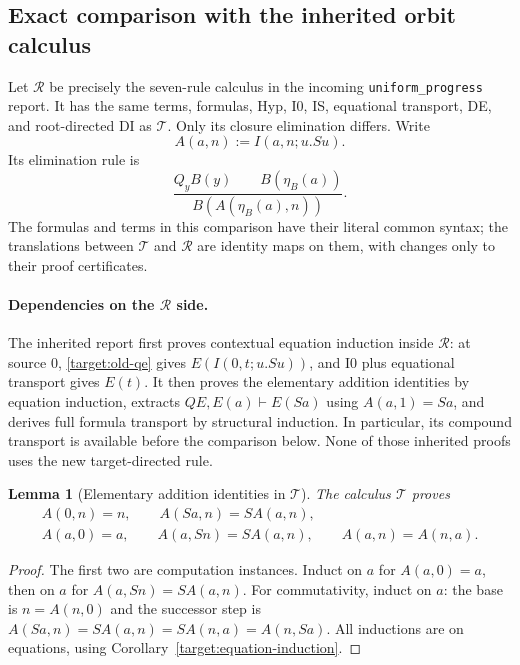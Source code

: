 \documentclass[11pt,a4paper]{article}
\newtheorem{lemma}[theorem]{Lemma}
\theoremstyle{definition}\newtheorem{definition}[theorem]{Definition}
\begin{document}
\subsection{Exact comparison with the inherited orbit calculus}
\label{target:orbit-equivalence-section}

Let $\mathcal R$ be precisely the seven-rule calculus in the incoming
\texttt{uniform\_progress} report.\cite{uniform}  It has the same terms, formulas, Hyp,
I0, IS, equational transport, DE, and root-directed DI as $\mathcal T$.
Only its closure elimination differs.  Write
\[
 A(a,n):=I(a,n;u.Su).
\]
Its elimination rule is
\begin{equation}
 \frac{Q_yB(y)\qquad B(\eta_B(a))}
      {B(A(\eta_B(a),n))}.
 \tag{Orbit QE}\label{target:old-qe}
\end{equation}
The formulas and terms in this comparison have their literal common
syntax; the translations between $\mathcal T$ and $\mathcal R$ are
identity maps on them, with changes only to their proof certificates.

\paragraph{Dependencies on the $\mathcal R$ side.}
The inherited report first proves contextual equation induction inside
$\mathcal R$: at source $0$, \eqref{target:old-qe} gives
$E(I(0,t;u.Su))$, and I0 plus equational transport gives $E(t)$.
It then proves the elementary addition identities by equation induction,
extracts $Q E,E(a)\vdash E(Sa)$ using $A(a,1)=Sa$, and derives full
formula transport by structural induction.  In particular, its compound
transport is available before the comparison below.  None of those
inherited proofs uses the new target-directed rule.

\begin{lemma}[Elementary addition identities in $\mathcal T$]
\label{target:addition}
The calculus $\mathcal T$ proves
\[
 \begin{gathered}
 A(0,n)=n,\qquad A(Sa,n)=S A(a,n),\\
 A(a,0)=a,\qquad A(a,Sn)=S A(a,n),\qquad A(a,n)=A(n,a).
 \end{gathered}
\]
\end{lemma}
\begin{proof}
The first two are computation instances.  Induct on $a$ for $A(a,0)=a$,
then on $a$ for $A(a,Sn)=S A(a,n)$.  For commutativity, induct on $a$:
the base is $n=A(n,0)$ and the successor step is
$A(Sa,n)=S A(a,n)=S A(n,a)=A(n,Sa)$.
All inductions are on equations, using
Corollary~\ref{target:equation-induction}.
\end{proof}
\end{document}
